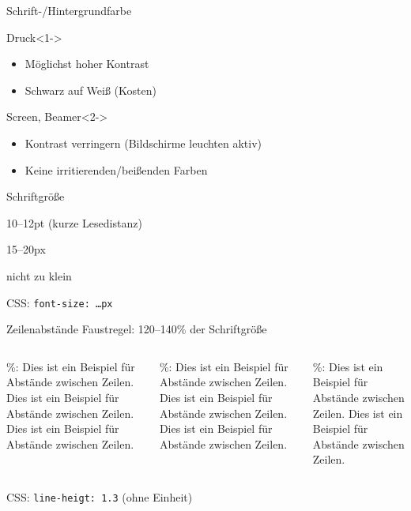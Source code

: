 \documentclass[ngerman,draft, usepdftitle=true]{beamer}
\newcommand*{\code}[1]{\texttt{#1}}
\begin{document}
\begin{frame}{Schrift-/Hintergrundfarbe}
  \begin{block}{Druck}<1->
    \begin{itemize}
    \item Möglichst hoher Kontrast
    \item Schwarz auf Weiß (Kosten)
    \end{itemize}
  \end{block}
  \begin{block}{Screen, Beamer}<2->
    \begin{itemize}
    \item Kontrast verringern (Bildschirme leuchten aktiv)
    \item Keine irritierenden/beißenden Farben
    \end{itemize}
  \end{block}
\end{frame}

\begin{frame}{Schriftgröße}
  \begin{description}
  \item[Druck] 10–12pt (kurze Lesedistanz)
  \item[Screen (insb. Web)] 15–20px
  \item[Präsentation] nicht zu klein
  \end{description}
  \vfill
  CSS: \code{font-size: …px}
\end{frame}

\begin{frame}{Zeilenabstände}
  Faustregel: 120–140\% der Schriftgröße
  \begin{columns}[onlytextwidth,T]
    \begin{column}{.3\paperwidth}
      \fontsize{8pt}{8.8pt}\selectfont
      \%:
      Dies ist ein Beispiel für Abstände zwischen Zeilen.
      Dies ist ein Beispiel für Abstände zwischen Zeilen.
      Dies ist ein Beispiel für Abstände zwischen Zeilen.
    \end{column}
    \begin{column}{.3\paperwidth}
      \fontsize{8pt}{10.4pt}\selectfont      
      \%:
      Dies ist ein Beispiel für Abstände zwischen Zeilen.
      Dies ist ein Beispiel für Abstände zwischen Zeilen.
      Dies ist ein Beispiel für Abstände zwischen Zeilen.
    \end{column}
    \begin{column}{.3\paperwidth}    
      \fontsize{8pt}{13.6pt}\selectfont
      \%:
      Dies ist ein Beispiel für Abstände zwischen Zeilen.
      Dies ist ein Beispiel für Abstände zwischen Zeilen.
    \end{column}
  \end{columns}
  \vfill
  CSS: \code{line-heigt: 1.3} (ohne Einheit)
\end{frame}
\end{document}
